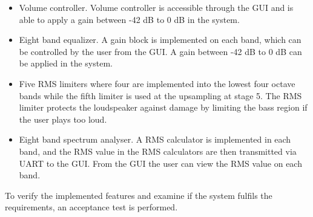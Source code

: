 \begin{itemize}
\item Volume controller. Volume controller is accessible through the GUI and is able to apply a gain between -42 dB to 0 dB in the system.
\item Eight band equalizer. A gain block is implemented on each band, which can be controlled by the user from the GUI. A gain between -42 dB to 0 dB can be applied in the system.
\item Five RMS limiters where four are implemented into the lowest four octave bands while the fifth limiter is used at the upsampling at stage 5. The RMS limiter protects the loudspeaker against damage by limiting the bass region if the user plays too loud. 
\item Eight band spectrum analyser. A RMS calculator is implemented in each band, and the RMS value in the RMS calculators are then transmitted via UART to the GUI. From the GUI the user can view the RMS value on each band.
\end{itemize}

To verify the implemented features and examine if the system fulfils the requirements, an acceptance test is performed.



